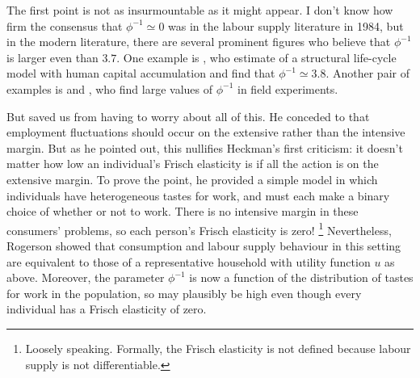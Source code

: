 \documentclass[11pt,letterpaper,reqno,oneside]{article}
\begin{document}
The first point is not as insurmountable as it might appear. I don't know how firm the consensus that $\phi^{-1} \simeq 0$ was in the labour supply literature in 1984, but in the modern literature, there are several prominent figures who believe that $\phi^{-1}$ is larger even than $3.7$. One example is \textcite{ImaiKeane2004}, who estimate of a structural life-cycle model with human capital accumulation and find that $\phi^{-1} \simeq 3.8$. Another pair of examples is \textcite{Oettinger1999} and \textcite{FehrGoette2007}, who find large values of $\phi^{-1}$ in field experiments.


But \textcite{Rogerson1988} saved us from having to worry about all of this. He conceded to \textcite{Heckman1984} that employment fluctuations should occur on the extensive rather than the intensive margin. But as he pointed out, this nullifies Heckman's first criticism: it doesn't matter how low an individual's Frisch elasticity is if all the action is on the extensive margin. To prove the point, he provided a simple model in which individuals have heterogeneous tastes for work, and must each make a binary choice of whether or not to work. There is no intensive margin in these consumers' problems, so each person's Frisch elasticity is zero!%
	\footnote{Loosely speaking. Formally, the Frisch elasticity is not defined because labour supply is not differentiable.}
Nevertheless, Rogerson showed that consumption and labour supply behaviour in this setting are equivalent to those of a representative household with utility function $u$ as above. Moreover, the parameter $\phi^{-1}$ is now a function of the distribution of tastes for work in the population, so may plausibly be high even though every individual has a Frisch elasticity of zero.
\end{document}
